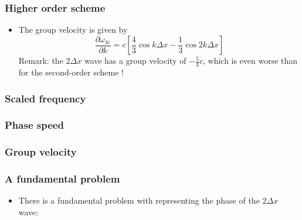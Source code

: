 \documentclass[aspectratio=149,9pt]{beamer}
\begin{document}
%
%
\begin{frame}
	\frametitle{Higher order scheme}
	\vfill\begin{itemize}
		\item The group velocity is given by
		\begin{equation*}
			\frac{\partial \omega_{4 c}}{\partial k} =c \left[ \frac43 \cos k \Delta x - \frac13 \cos 2 k \Delta x \right]
		\end{equation*}
		Remark: the $2 \Delta x$ wave has a group velocity of $-\frac53 c$, which is even worse than for the second-order scheme !
	\end{itemize}\vfill
\end{frame}
%
%
\begin{frame}
	\frametitle{Scaled frequency}
	\begin{center}
		\scalebox{.8}{}
	\end{center}
\end{frame}
%
%
\begin{frame}
	\frametitle{Phase speed}
	\begin{center}
		\scalebox{.8}{}
	\end{center}
\end{frame}
%
%
\begin{frame}
	\frametitle{Group velocity}
	\begin{center}
		\scalebox{.8}{}
	\end{center}
\end{frame}
%
%
\begin{frame}
	\frametitle{A fundamental problem}
	\vfill\begin{itemize}
		\item There is a fundamental problem with representing the phase of the $2\Delta x$ wave:
			\begin{center}%
				\only<2->{%
					\scalebox{.8}{}%
				}%
			\end{center}%
	\end{itemize}\vfill
\end{frame}
\end{document}
